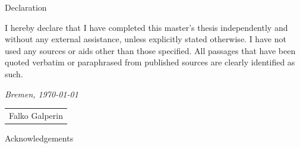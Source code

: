 \documentclass[%
	paper=A4,
	twoside=true,
	openright,
	parskip=half,           %
  11pt,
	chapterprefix=true,     %
	headings=normal,        %
	bibliography=totocnumbered,     %
	listof=totocnumbered,   %
	titlepage=on,           %
	captions=tableabove,    %
]{scrbook}
\newcommand{\myName}{Falko Galperin\xspace}
\begin{document}
\fxfatal{}

\cleardoublepage{}

{Declaration}


I hereby declare that I have completed this master's thesis independently and without any external assistance, unless explicitly stated otherwise.
I have not used any sources or aids other than those specified.
All passages that have been quoted verbatim or paraphrased from published sources are clearly identified as such.

\bigskip

\noindent\textit{Bremen, \today}
\smallskip
\begin{flushright}
	\begin{tabular}{m{5cm}}
		\\ \hline
		\centering\myName \\
	\end{tabular}
\end{flushright}

\vfill

{Acknowledgements}

\fxfatal{}
\end{document}
